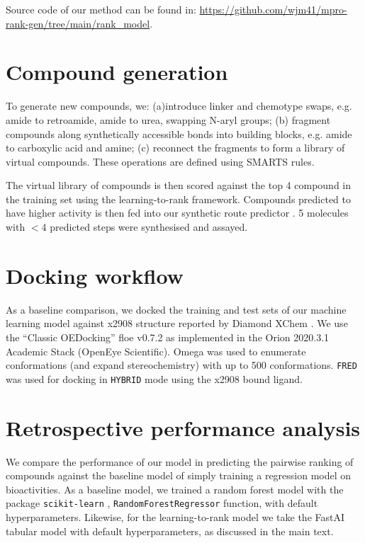 Source code of our method can be found in: \url{https://github.com/wjm41/mpro-rank-gen/tree/main/rank_model}.  

\section{Compound generation} 
To generate new compounds, we: (a)introduce linker and chemotype swaps, e.g. amide to retroamide, amide to urea, swapping N-aryl groups; (b) fragment compounds along synthetically accessible bonds into building blocks, e.g. amide to carboxylic acid and amine; (c) reconnect the fragments to form a library of virtual compounds. These operations are defined using SMARTS rules. 

The virtual library of compounds is then scored against the top 4 compound in the training set using the learning-to-rank framework. Compounds predicted to have higher activity is then fed into our synthetic route predictor \cite{schwaller2019molecular,yang2019molecular}. 5 molecules with $<$4 predicted steps were synthesised and assayed. 


\section{Docking workflow} 

As a baseline comparison, we docked the training and test sets of our machine learning model against x2908 structure reported by Diamond XChem \cite{douangamath2020crystallographic}.  We use the ``Classic OEDocking'' floe v0.7.2 as implemented in the Orion 2020.3.1 Academic Stack (OpenEye Scientific). Omega was used to enumerate conformations (and expand stereochemistry) with up to 500 conformations. \texttt{FRED} was used for docking in \texttt{HYBRID} mode using the x2908 bound ligand. 


\section{Retrospective performance analysis} 

We compare the performance of our model in predicting the pairwise ranking of compounds against the baseline model of simply training a regression model on bioactivities. As a baseline model, we trained a random forest model with the package \texttt{scikit-learn} \cite{scikit-learn}, \texttt{RandomForestRegressor} function, with default hyperparameters. Likewise, for the learning-to-rank model we take the FastAI tabular model with default hyperparameters, as discussed in the main text. 

